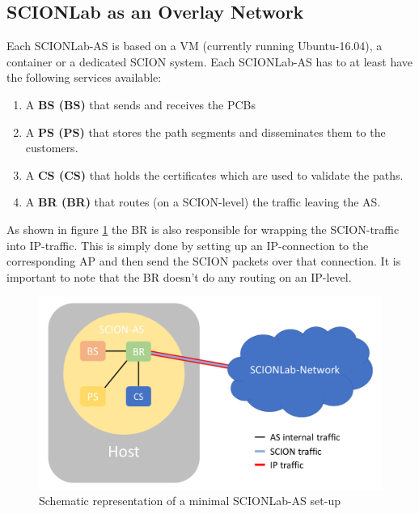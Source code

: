 \subsection{SCIONLab as an Overlay Network}

Each \acs{SCIONLab}-\acs{AS} is based on a  \acs{VM} (currently running Ubuntu-16.04), a container or a dedicated \acs{SCION} system. Each \acs{SCIONLab}-\acs{AS} has to at least have the following services available: 
\\
\begin{enumerate}
\item A \textbf{\acl{BS} (\acs{BS})} that sends and receives the \acsp{PCB}
\item A \textbf{\acl{PS} (\acs{PS})} that stores the path segments and disseminates them to the customers.
\item A \textbf{\acl{CS} (\acs{CS})} that holds the certificates which are used to validate the paths.
\item A \textbf{\acl{BR} (\acs{BR})} that routes (on a \acs{SCION}-level) the traffic leaving the \acs{AS}.
\end{enumerate}

As shown in figure \ref{SCIONLab-AS} the \acl{BR} is also responsible for wrapping the \acs{SCION}-traffic into \acs{IP}-traffic. This is simply done by setting up an \acs{IP}-connection to the corresponding \acl{AP} and then send the \acs{SCION} packets over that connection. It is important to note that the \acl{BR} doesn't do any routing on an \acs{IP}-level.

\begin{figure}[h]
	\centering
	\includegraphics[width=\textwidth]{img/SCIONLab-AS.png}
	\caption{Schematic representation of a minimal SCIONLab-AS set-up}
	\label{SCIONLab-AS}
\end{figure}

